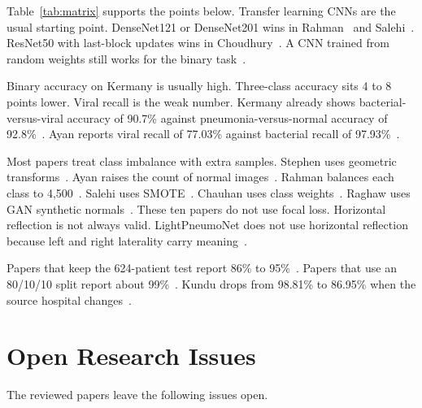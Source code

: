 \documentclass[conference]{IEEEtran}
\begin{document}
Table~\ref{tab:matrix} supports the points below. Transfer learning CNNs are the usual starting point. DenseNet121 or DenseNet201 wins in Rahman~\cite{rahman2020} and Salehi~\cite{salehi2021}. ResNet50 with last-block updates wins in Choudhury~\cite{choudhury2026}. A CNN trained from random weights still works for the binary task~\cite{stephen2019,chauhan2025}.

Binary accuracy on Kermany is usually high. Three-class accuracy sits 4 to 8 points lower. Viral recall is the weak number. Kermany already shows bacterial-versus-viral accuracy of 90.7\% against pneumonia-versus-normal accuracy of 92.8\%~\cite{kermany2018}. Ayan reports viral recall of 77.03\% against bacterial recall of 97.93\%~\cite{ayan2021}.

Most papers treat class imbalance with extra samples. Stephen uses geometric transforms~\cite{stephen2019}. Ayan raises the count of normal images~\cite{ayan2021}. Rahman balances each class to 4{,}500~\cite{rahman2020}. Salehi uses SMOTE~\cite{salehi2021}. Chauhan uses class weights~\cite{chauhan2025}. Raghaw uses GAN synthetic normals~\cite{raghaw2024}. These ten papers do not use focal loss. Horizontal reflection is not always valid. LightPneumoNet does not use horizontal reflection because left and right laterality carry meaning~\cite{chauhan2025}.

Papers that keep the 624-patient test report 86\% to 95\%~\cite{kermany2018,rajaraman2018,salehi2021,ayan2021}. Papers that use an 80/10/10 split report about 99\%~\cite{raghaw2024,choudhury2026}. Kundu drops from 98.81\% to 86.95\% when the source hospital changes~\cite{kundu2021}.

\FloatBarrier

\section{Open Research Issues}
\label{sec:gaps}
The reviewed papers leave the following issues open.
\end{document}
